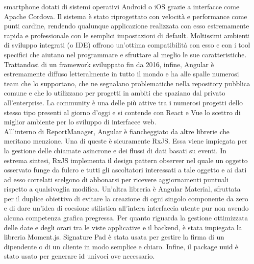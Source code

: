 smartphone dotati di sistemi operativi Android o iOS grazie a interfacce come Apache Cordova.
Il sistema è stato riprogettato con velocità e performance come punti cardine, rendendo qualunque applicazione realizzata con esso estremamente rapida e professionale con 
le semplici impostazioni di default.
Moltissimi ambienti di sviluppo integrati (o IDE) offrono un'ottima compatibilità con esso e con i tool specifici che aiutano nel programmare e sfruttare al meglio le sue 
caratteristiche.
Trattandosi di un framework sviluppato fin da 2016, infine, Angular è estremamente diffuso letteralmente in tutto il mondo e ha alle spalle numerosi team che lo supportano,
che ne segnalano problematiche nella repository pubblica comune e che lo utilizzano per progetti in ambiti che spaziano dal privato all'enterprise.
La community è una delle più attive tra i numerosi progetti dello stesso tipo presenti al giorno d'oggi e si contende con React e Vue lo scettro di miglior ambiente per lo 
sviluppo di interfacce web.
\\
All'interno di ReportManager, Angular è fiancheggiato da altre librerie che meritano menzione.
Una di queste è sicuramente RxJS. Essa viene impiegata per la gestione delle chiamate asincrone e dei flussi di dati basati su eventi.
In estrema sintesi, RxJS implementa il design pattern observer nel quale un oggetto osservato funge da fulcro e tutti gli ascoltatori interessati a tale oggetto e ai dati ad esso
correlati scelgono di abbonarsi per ricevere aggiornamenti puntuali rispetto a qualsivoglia modifica.
Un'altra libreria è Angular Material, sfruttata per il duplice obiettivo di evitare la creazione di ogni singolo componente da zero e di dare un'idea di coesione stilistica
all'intera interfaccia utente pur non avendo alcuna competenza grafica pregressa.
Per quanto riguarda la gestione ottimizzata delle date e degli orari tra le viste applicative e il backend, è stata impiegata la libreria Moment.js.
Signature Pad è stata usata per gestire la firma di un dipendente o di un cliente in modo semplice e chiaro.
Infine, il package uuid è stato usato per generare id univoci ove necessario.